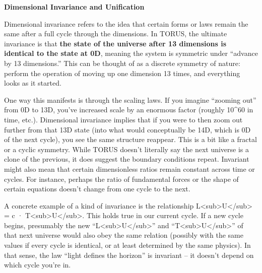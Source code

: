 \documentclass[]{article}
\begin{document}
\textbf{Dimensional Invariance and Unification}

Dimensional invariance refers to the idea that certain forms or laws
remain the same after a full cycle through the dimensions. In TORUS, the
ultimate invariance is that \textbf{the state of the universe after 13
dimensions is identical to the state at 0D}, meaning the system is
symmetric under ``advance by 13 dimensions.'' This can be thought of as
a discrete symmetry of nature: perform the operation of moving up one
dimension 13 times, and everything looks as it started​.

One way this manifests is through the scaling laws. If you imagine
``zooming out'' from 0D to 13D, you've increased scale by an enormous
factor (roughly 10\^{}60 in time, etc.). Dimensional invariance implies
that if you were to then zoom out further from that 13D state (into what
would conceptually be 14D, which is 0D of the next cycle), you see the
same structure reappear. This is a bit like a fractal or a cyclic
symmetry. While TORUS doesn't literally say the next universe is a clone
of the previous, it does suggest the boundary conditions repeat.
Invariant might also mean that certain dimensionless ratios remain
constant across time or cycles. For instance, perhaps the ratio of
fundamental forces or the shape of certain equations doesn't change from
one cycle to the next.

A concrete example of a kind of invariance is the relationship
L\textless{}sub\textgreater{}U\textless{}/sub\textgreater{} = c ·
T\textless{}sub\textgreater{}U\textless{}/sub\textgreater{}. This holds
true in our current cycle. If a new cycle begins, presumably the new
``L\textless{}sub\textgreater{}U\textless{}/sub\textgreater{}'' and
``T\textless{}sub\textgreater{}U\textless{}/sub\textgreater{}'' of that
next universe would also obey the same relation (possibly with the same
values if every cycle is identical, or at least determined by the same
physics). In that sense, the law ``light defines the horizon'' is
invariant -- it doesn't depend on which cycle you're in.
\end{document}
